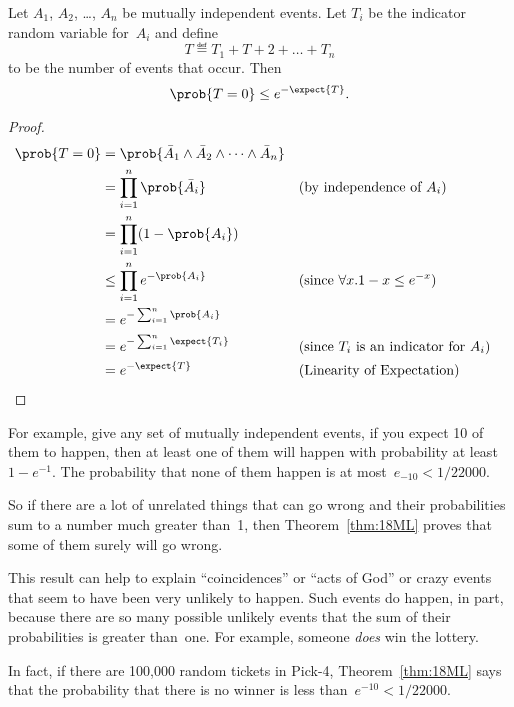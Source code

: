 \begin{theorem}\label{thm:18ML}
Let $A_1$, $A_2$, \dots, $A_n$ be mutually independent events.  Let
$T_i$ be the indicator random variable for~$A_i$ and define
\begin{equation*}
    T \eqdef T_1 + T+2 + \dots + T_n
\end{equation*}
to be the number of events that occur.  Then
\begin{equation*}
    \prob{T = 0} \le e^{- \expect{T}}.
\end{equation*}
\end{theorem}

\begin{proof}
\begin{align*}
\prob{T = 0}
    &= \prob{ \bar{A}_1 \land \bar{A}_2 \land \dots \land \bar{A}_n } \\
    &= \prod_{i = 1}^n \prob{\bar{A}_i}
        && \text{(by independence of $A_i$)} \\
    &= \prod_{i = 1}^n (1 - \prob{A_i}) \\
    &\le \prod_{i = 1}^n e^{-\prob{A_i}}
        && \text{(since $\forall x. 1 - x \le e^{-x}$)} \\
    &= e^{-\sum_{i = 1}^n \prob{A_i}} \\
    &= e^{-\sum_{i = 1}^n \expect{T_i}} 
        && \text{(since $T_i$ is an indicator for $A_i$)} \\
    &= e^{-\expect{T}}
        && \text{(Linearity of Expectation)}
        & \qedhere
\end{align*}
\end{proof}

For example, give any set of mutually independent events, if you
expect 10 of them to happen, then at least one of them will happen
with probability at least~$1 - e^{-1}$.  The probability that none of
them happen is at most~$e_{-10} < 1/22000$.

So if there are a lot of unrelated things that can go wrong and their
probabilities sum to a number much greater than~1, then
Theorem~\ref{thm:18ML} proves that some of them surely will go wrong.

This result can help to explain ``coincidences'' or ``acts of God'' or
crazy events that seem to have been very unlikely to happen.  Such
events do happen, in part, because there are so many possible unlikely
events that the sum of their probabilities is greater than~one.  For
example, someone \emph{does} win the lottery.

In fact, if there are 100,000 random tickets in Pick-4,
Theorem~\ref{thm:18ML} says that the probability that there is no
winner is less than~$e^{-10} < 1/22000$.

\problemsection

\endinput

